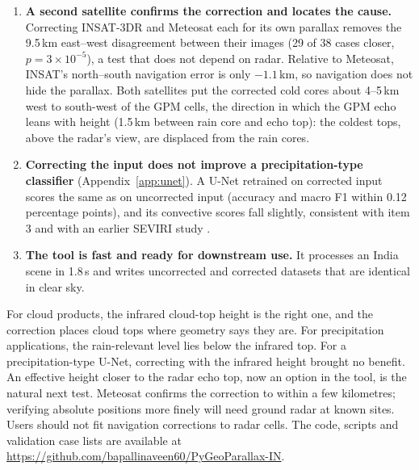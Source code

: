 \begin{enumerate}
\begin{itemize}
    \item Brightness-temperature heights of the coldest tops lie at the tropopause, about 3\,km above the GPM echo tops, with either the standard atmosphere or ERA5.
    \item In the 14 cases of 2022--2024, ERA5 profiles change the offsets by less than 0.5\,km and terrain by less than 0.1\,km; terrain moves clear-sky ground in the Himalaya by up to 6\,km.
  \end{itemize}
  \item \textbf{A second satellite confirms the correction and locates the cause.} Correcting INSAT-3DR and Meteosat each for its own parallax removes the 9.5\,km east--west disagreement between their images (29 of 38 cases closer, $p=3\times10^{-5}$), a test that does not depend on radar. Relative to Meteosat, INSAT's north--south navigation error is only $-1.1$\,km, so navigation does not hide the parallax. Both satellites put the corrected cold cores about 4--5\,km west to south-west of the GPM cells, the direction in which the GPM echo leans with height (1.5\,km between rain core and echo top): the coldest tops, above the radar's view, are displaced from the rain cores.
  \item \textbf{Correcting the input does not improve a precipitation-type classifier} (Appendix~\ref{app:unet}). A U-Net retrained on corrected input scores the same as on uncorrected input (accuracy and macro F1 within 0.12 percentage points), and its convective scores fall slightly, consistent with item 3 and with an earlier SEVIRI study \citep{dadderio2023}.
  \item \textbf{The tool is fast and ready for downstream use.} It processes an India scene in 1.8\,s and writes uncorrected and corrected datasets that are identical in clear sky.
\end{enumerate}

For cloud products, the infrared cloud-top height is the right one, and the correction places cloud tops where geometry says they are. For precipitation applications, the rain-relevant level lies below the infrared top. For a precipitation-type U-Net, correcting with the infrared height brought no benefit. An effective height closer to the radar echo top, now an option in the tool, is the natural next test. Meteosat confirms the correction to within a few kilometres; verifying absolute positions more finely will need ground radar at known sites. Users should not fit navigation corrections to radar cells. The code, scripts and validation case lists are available at \url{https://github.com/bapallinaveen60/PyGeoParallax-IN}.
